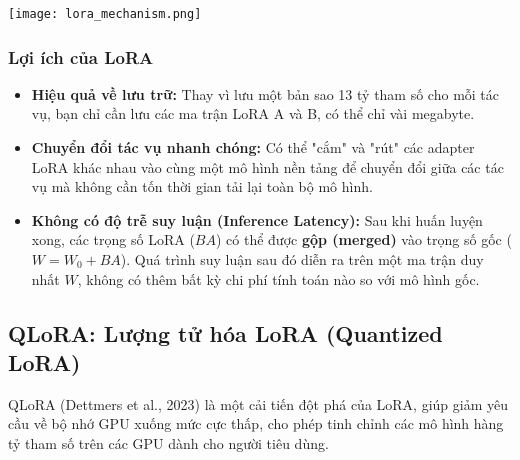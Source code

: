 \begin{center}
    \texttt{[image: lora\_mechanism.png]}
    \label{fig:lora_mechanism}
\end{center}

\subsubsection{Lợi ích của LoRA}
\begin{itemize}
    \item \textbf{Hiệu quả về lưu trữ:} Thay vì lưu một bản sao 13 tỷ tham số cho mỗi tác vụ, bạn chỉ cần lưu các ma trận LoRA A và B, có thể chỉ vài megabyte.
    \item \textbf{Chuyển đổi tác vụ nhanh chóng:} Có thể "cắm" và "rút" các adapter LoRA khác nhau vào cùng một mô hình nền tảng để chuyển đổi giữa các tác vụ mà không cần tốn thời gian tải lại toàn bộ mô hình.
    \item \textbf{Không có độ trễ suy luận (Inference Latency):} Sau khi huấn luyện xong, các trọng số LoRA ($BA$) có thể được \textbf{gộp (merged)} vào trọng số gốc ($W = W_0 + BA$). Quá trình suy luận sau đó diễn ra trên một ma trận duy nhất $W$, không có thêm bất kỳ chi phí tính toán nào so với mô hình gốc.
\end{itemize}

\subsection{QLoRA: Lượng tử hóa LoRA (Quantized LoRA)}
\label{ssec:qlora}
QLoRA (Dettmers et al., 2023) \cite{dettmers2023qlora} là một cải tiến đột phá của LoRA, giúp giảm yêu cầu về bộ nhớ GPU xuống mức cực thấp, cho phép tinh chỉnh các mô hình hàng tỷ tham số trên các GPU dành cho người tiêu dùng.

